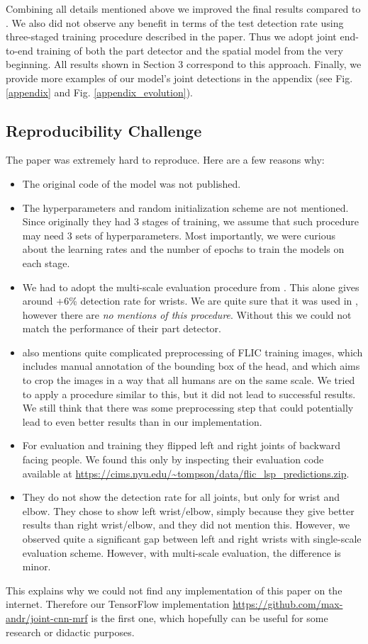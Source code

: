 \documentclass[a4paper,10pt]{article}
\begin{document}
	Combining all details mentioned above we improved the final results compared to \cite{cnn_pgm_for_hpe}. We also did not observe any benefit in terms of the test detection rate using three-staged training procedure described in the paper. Thus we adopt joint end-to-end training of both the part detector and the spatial model from the very beginning. All results shown in Section 3 correspond to this approach. Finally, we provide more examples of our model's joint detections in the appendix (see Fig. \ref{appendix} and Fig. \ref{appendix_evolution}).
	

	\subsection{Reproducibility Challenge}
	The paper \cite{cnn_pgm_for_hpe} was extremely hard to reproduce. Here are a few reasons why:
	\begin{itemize}
		\item The original code of the model was not published.
		\item The hyperparameters and random initialization scheme are not mentioned. Since originally they had 3 stages of training, we assume that such procedure may need 3 sets of hyperparameters. Most importantly, we were curious about the learning rates and the number of epochs to train the models on each stage.
		\item We had to adopt the multi-scale evaluation procedure from \cite{prev_iclr_paper}. This alone gives around +6\% detection rate for wrists. We are quite sure that it was used in \cite{cnn_pgm_for_hpe}, however there are \textit{no mentions of this procedure}. Without this we could not match the performance of their part detector.
		\item \cite{prev_iclr_paper} also mentions quite complicated preprocessing of FLIC training images, which includes manual annotation of the bounding box of the head, and which aims to crop the images in a way that all humans are on the same scale. We tried to apply a procedure similar to this, but it did not lead to successful results. We still think that there was some preprocessing step that could potentially lead to even better results than in our implementation.
		\item For evaluation and training they flipped left and right joints of backward facing people. We found this only by inspecting their evaluation code available at \url{https://cims.nyu.edu/~tompson/data/flic_lsp_predictions.zip}.
		\item They do not show the detection rate for all joints, but only for wrist and elbow. They chose to show left wrist/elbow, simply because they give better results than right wrist/elbow, and they did not mention this. However, we observed quite a significant gap between left and right wrists with single-scale evaluation scheme. However, with multi-scale evaluation, the difference is minor.
	\end{itemize}
	This explains why we could not find any implementation of this paper on the internet. Therefore our TensorFlow implementation \url{https://github.com/max-andr/joint-cnn-mrf} is the first one, which hopefully can be useful for some research or didactic purposes.
	
\end{document}
